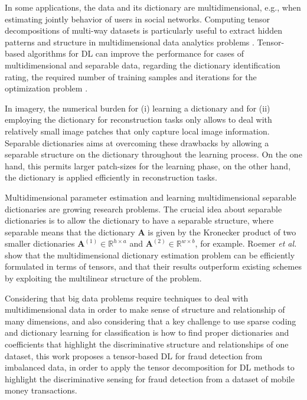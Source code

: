 In some applications, the data and its dictionary are multidimensional, e.g., when estimating jointly behavior of users in social networks. Computing tensor decompositions of multi-way datasets is particularly useful to extract hidden patterns and structure in multidimensional data analytics problems \cite{kolda2009tensor}. Tensor-based algorithms for DL can improve the performance for cases of multidimensional and separable data, regarding the dictionary identification rating, the required number of training samples and iterations for the optimization problem \cite{roemer2014tensor}. 

In imagery, the numerical burden for (i) learning a dictionary and for (ii) employing the dictionary for reconstruction tasks only allows to deal with relatively small image patches that only capture local image information. Separable dictionaries aims at overcoming these drawbacks by allowing a separable structure on the dictionary throughout the learning process. On the one hand, this permits larger patch-sizes for the learning phase, on the other hand, the dictionary is applied efficiently in reconstruction tasks. 

Multidimensional parameter estimation and learning multidimensional separable dictionaries are growing research problems. The crucial idea about separable dictionaries is to allow the dictionary to have a separable structure, where separable means that the dictionary $\textbf{A}$ is given by the Kronecker product of two smaller dictionaries $\textbf{A}^{(1)} \in \mathbb{R}^{h \times a}$ and $\textbf{A}^{(2)} \in \mathbb{R}^{w \times b}$, for example. Roemer \emph{et al.} \cite{roemer2014tensor} show that the multidimensional dictionary estimation problem can be efficiently formulated in terms of tensors, and that their results outperform existing schemes by exploiting the multilinear structure of the problem.

Considering that big data problems require techniques to deal with multidimensional data in order to make sense of structure and relationship of many dimensions, and also considering that a key challenge to use sparse coding and dictionary learning for classification is how to find proper dictionaries and coefficients that highlight the discriminative structure and relationships of one dataset, this work proposes a tensor-based DL for fraud detection from imbalanced data, in order to apply the tensor decomposition for DL methods to highlight the discriminative sensing for fraud detection from a dataset of mobile money transactions. 

